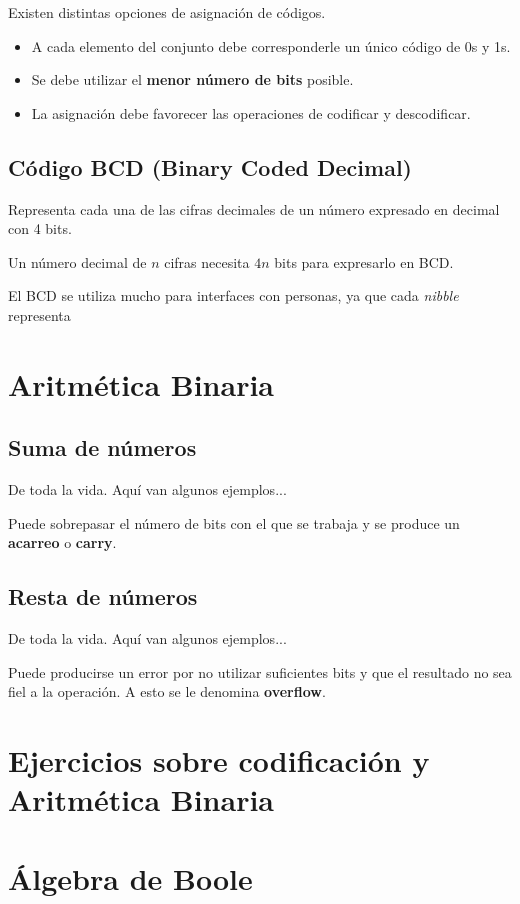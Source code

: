 \documentclass[a4paper]{book}
\begin{document}
Existen distintas opciones de asignación de códigos. \begin{itemize}
	\item A cada elemento del conjunto debe corresponderle un único código de 0s y 1s.
	\item Se debe utilizar el \textbf{menor número de bits} posible.
	\item La asignación debe favorecer las operaciones de codificar y descodificar.
\end{itemize}
\subsection{Código BCD (Binary Coded Decimal)}
Representa cada una de las cifras decimales de un número expresado en decimal con 4 bits.

Un número decimal de $n$ cifras necesita $4n$ bits para expresarlo en BCD.

El BCD se utiliza mucho para interfaces con personas, ya que cada \textit{nibble} representa
\section{Aritmética Binaria}

\subsection{Suma de números}
De toda la vida. Aquí van algunos ejemplos...

Puede sobrepasar el número de bits con el que se trabaja y se produce un \textbf{acarreo} o \textbf{carry}.

\subsection{Resta de números}
De toda la vida. Aquí van algunos ejemplos...

Puede producirse un error por no utilizar suficientes bits y que el resultado no sea fiel a la operación. A esto se le denomina \textbf{overflow}.

\section{Ejercicios sobre codificación y Aritmética Binaria}


\section{Álgebra de Boole}
\end{document}
